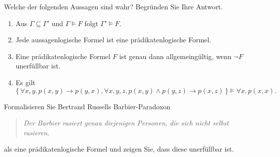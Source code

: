 \documentclass[german]{latteachCD}[2017/03/28]
\begin{document}
\begin{exercise}
  Welche der folgenden Aussagen sind wahr?  Begründen Sie Ihre Antwort.
  \begin{enumerate}
  \item Aus $\Gamma \subseteq \Gamma'$ und $\Gamma \models F$ folgt $\Gamma'
    \models F$.
  \item Jede aussagenlogische Formel ist eine prädikatenlogische Formel.
  \item Eine prädikatenlogische Formel $F$ ist genau dann allgemeingültig,
    wenn $\lnot F$ unerfüllbar ist.
  \item Es gilt
    \begin{equation*}
      \{\,\forall x, y.\, p(x,y) \to p(y,x), \forall x, y, z.\, p(x,y) \land p(y,z)
      \to p(x,z)\,\} \models \forall x.\, p(x,x).
    \end{equation*}
  \end{enumerate}
\end{exercise}

\begin{exercise}
  Formalisieren Sie Bertrand Russells Barbier-Paradoxon
  \begin{quote}
    \emph{Der Barbier rasiert genau diejenigen Personen, die sich nicht selbst rasieren.}
  \end{quote}
  als eine prädikatenlogische Formel und zeigen Sie, dass diese unerfüllbar ist.
\end{exercise}
\end{document}
